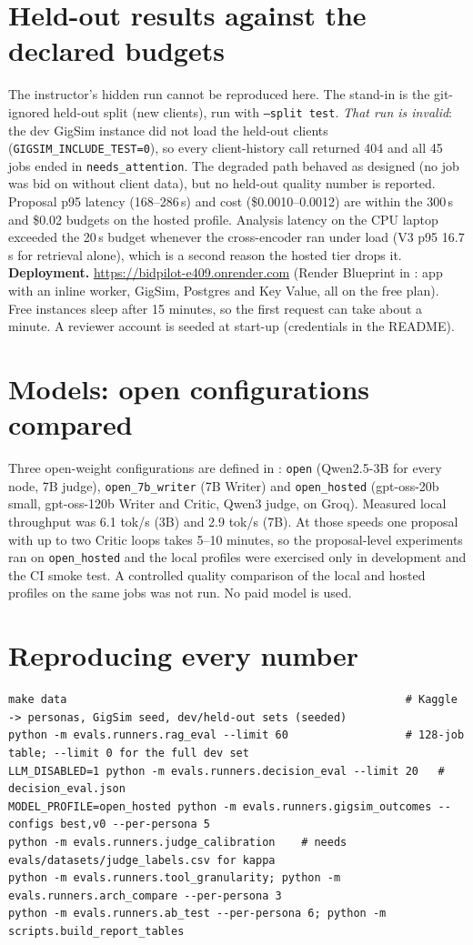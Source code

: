 \documentclass[10pt,a4paper]{article}
\newcommand{\file}[1]{\texttt{\detokenize{#1}}}
\begin{document}
\section{Held-out results against the declared budgets}
The instructor's hidden run cannot be reproduced here. The stand-in is the git-ignored held-out split (new clients), run with
\texttt{--split test}. \emph{That run is invalid}: the dev GigSim instance did not load the held-out clients
(\texttt{GIGSIM\_INCLUDE\_TEST=0}), so every client-history call returned 404 and all 45 jobs ended in \texttt{needs\_attention}. The degraded
path behaved as designed (no job was bid on without client data), but no held-out quality number is reported.
Proposal p95 latency (168--286\,s) and cost (\$0.0010--0.0012) are within the 300\,s and \$0.02 budgets on the hosted profile. Analysis latency
on the CPU laptop exceeded the 20\,s budget whenever the cross-encoder ran under load (V3 p95 16.7\,s for retrieval alone), which is a
second reason the hosted tier drops it.
\textbf{Deployment.} \url{https://bidpilot-e409.onrender.com} (Render Blueprint in \file{render.yaml}: app with an inline worker, GigSim,
Postgres and Key Value, all on the free plan). Free instances sleep after 15 minutes, so the first request can take about a minute. A reviewer
account is seeded at start-up (credentials in the README).

\section{Models: open configurations compared}\label{sec:models}
Three open-weight configurations are defined in \file{agent/config.yaml}: \texttt{open} (Qwen2.5-3B for every node, 7B judge),
\texttt{open\_7b\_writer} (7B Writer) and \texttt{open\_hosted} (gpt-oss-20b small, gpt-oss-120b Writer and Critic, Qwen3 judge, on Groq).
Measured local throughput was 6.1 tok/s (3B) and 2.9 tok/s (7B). At those speeds one proposal with up to two Critic loops takes 5--10
minutes, so the proposal-level experiments ran on \texttt{open\_hosted} and the local profiles were exercised only in development and the CI
smoke test. A controlled quality comparison of the local and hosted profiles on the same jobs was not run. No paid model is used.

\appendix
\section{Reproducing every number}
{\scriptsize
\begin{verbatim}
make data                                                    # Kaggle -> personas, GigSim seed, dev/held-out sets (seeded)
python -m evals.runners.rag_eval --limit 60                  # 128-job table; --limit 0 for the full dev set
LLM_DISABLED=1 python -m evals.runners.decision_eval --limit 20   # decision_eval.json
MODEL_PROFILE=open_hosted python -m evals.runners.gigsim_outcomes --configs best,v0 --per-persona 5
python -m evals.runners.judge_calibration    # needs evals/datasets/judge_labels.csv for kappa
python -m evals.runners.tool_granularity; python -m evals.runners.arch_compare --per-persona 3
python -m evals.runners.ab_test --per-persona 6; python -m scripts.build_report_tables
\end{verbatim}}
\end{document}
